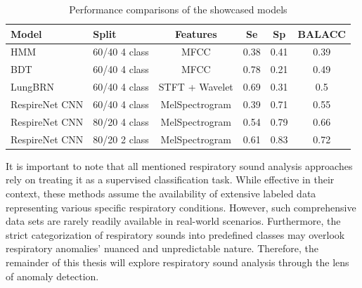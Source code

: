 \begin{table}[h!]
    \centering
    \caption{
        Performance comparisons of the showcased models 
    }
    \begin{tabularx}{\linewidth}{lXcccc}
    \toprule
    \textbf{Model}        & \textbf{Split} & \textbf{Features} & \textbf{Se} & \textbf{Sp} & \textbf{BALACC} \\
    \midrule
    HMM                   & 60/40 4 class          & MFCC              & 0.38                & 0.41                 & 0.39 \\
    BDT                   & 60/40 4 class          & MFCC              & 0.78                & 0.21                 & 0.49 \\
    LungBRN               & 60/40 4 class          & STFT + Wavelet    & 0.69                & 0.31                 & 0.5  \\
    RespireNet CNN        & 60/40 4 class          & MelSpectrogram    & 0.39                & 0.71                 & 0.55 \\
    RespireNet CNN        & 80/20 4 class  & MelSpectrogram    & 0.54                & 0.79                 & 0.66 \\
    RespireNet CNN        & 80/20 2 class  & MelSpectrogram    & 0.61                & 0.83                 & 0.72 \\
    \bottomrule
    \end{tabularx}
\end{table}
    
It is important to note that all mentioned respiratory sound analysis approaches rely on treating it as a supervised classification task. While effective in their context, these methods assume the availability of extensive labeled data representing various specific respiratory conditions. However, such comprehensive data sets are rarely readily available in real-world scenarios. Furthermore, the strict categorization of respiratory sounds into predefined classes may overlook respiratory anomalies' nuanced and unpredictable nature. Therefore, the remainder of this thesis will explore respiratory sound analysis through the lens of anomaly detection.

